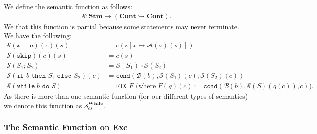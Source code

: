 \documentclass[a4paper, 12pt, twoside]{article}
\begin{document}
We define the semantic function as follows: \begin{gather*}
  \mathcal{S}: \textbf{Stm} \to (\textbf{Cont} \hookrightarrow \textbf{Cont}).
\end{gather*} We that this function is partial because some statements
may never terminate. We have the following: \begin{align*}
  \mathcal{S}(x = a)(c)(s) &= c(s[x \mapsto \mathcal{A}(a)(s)]) \\
  \mathcal{S}(\texttt{skip})(c)(s) &= c(s) \\
  \mathcal{S}(S_1 ; S_2) &= \mathcal{S}(S_1) \circ \mathcal{S}(S_2) \\
  \mathcal{S}(\texttt{if } b \texttt{ then } S_1 \texttt{ else } S_2)(c)
  &= \texttt{cond}(\mathcal{B}(b), \mathcal{S}(S_1)(c), \mathcal{S}(S_2)(c)) \\
  \mathcal{S}(\texttt{while } b \texttt{ do } S)
  &= \texttt{FIX } F \text{ (where } F(g)(c) 
  := \texttt{cond}(\mathcal{B}(b), \mathcal{S}(S)(g(c)), c)).
\end{align*} 
As there is more than one semantic function (for our different types
of semantics) we denote this function as $\mathcal{S}_{cs}^{\textbf{While}}$.

\subsubsection{The Semantic Function on \textbf{Exc}} 
\end{document}
